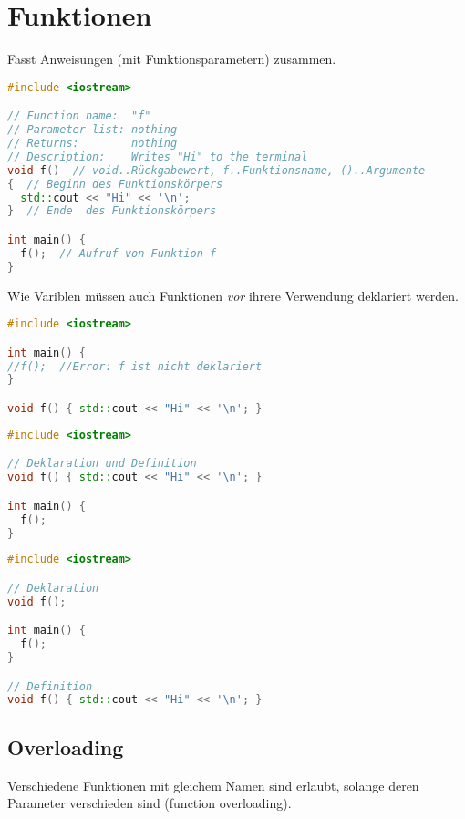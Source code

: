 \section{Funktionen}
\label{sec:Funtkionen}

Fasst Anweisungen (mit Funktionsparametern) zusammen.

\begin{lstlisting}[language=C++]
#include <iostream>

// Function name:  "f"
// Parameter list: nothing
// Returns:        nothing
// Description:    Writes "Hi" to the terminal
void f()  // void..Rückgabewert, f..Funktionsname, ()..Argumente
{  // Beginn des Funktionskörpers
  std::cout << "Hi" << '\n';
}  // Ende  des Funktionskörpers

int main() {
  f();  // Aufruf von Funktion f
}
\end{lstlisting}

Wie Variblen müssen auch Funktionen \emph{vor} ihrere Verwendung deklariert
werden.

\begin{lstlisting}[language=C++]
#include <iostream>

int main() {
//f();  //Error: f ist nicht deklariert
}

void f() { std::cout << "Hi" << '\n'; }
\end{lstlisting}

\begin{lstlisting}[language=C++]
#include <iostream>

// Deklaration und Definition
void f() { std::cout << "Hi" << '\n'; }

int main() {
  f();
}
\end{lstlisting}

\begin{lstlisting}[language=C++]
#include <iostream>

// Deklaration
void f();

int main() {
  f();
}

// Definition
void f() { std::cout << "Hi" << '\n'; }
\end{lstlisting}

\subsection{Overloading}

Verschiedene Funktionen mit gleichem Namen sind erlaubt, solange deren Parameter
verschieden sind (function overloading).

